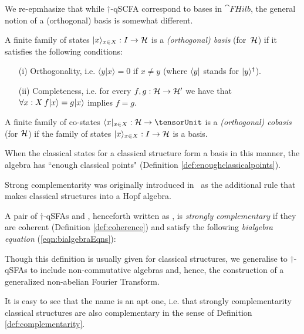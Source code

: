 We re-epmhasize that while $\dagger$-qSCFA correspond to bases in $\cat{FHilb}$, the general notion of a (orthogonal) basis is somewhat different.

\begin{defn}\label{def_basis}
A finite family of states $| x \rangle_{x\in X}: I \rightarrow \mathcal{H}$ is a \emph{(orthogonal) basis} (for~$\mathcal{H}$) if it satisfies the following conditions:
\begin{enumerate}
\item[(i)] Orthogonality, i.e. $\langle y|x\rangle = 0$ if $x \neq y$ (where $\langle y |$ stands for $| y \rangle^\dagger$).
\item[(ii)] Completeness, i.e. for every $f,g : \mathcal{H} \rightarrow \mathcal{H}'$ we have that $\forall x:X \, f | x \rangle = g | x \rangle$ implies $f=g$. 
\end{enumerate}
A finite family of co-states $\bra{x}_{x\in X}: \SpaceH \rightarrow \tensorUnit$ is a \emph{(orthogonal) cobasis} (for $\mathcal{H}$) if the family of states $| x \rangle_{x\in X}: I \rightarrow \mathcal{H}$ is a basis.
\end{defn}
\noindent When the classical states for a classical structure form a basis in this manner, the algebra has ``enough classical points" (Definition \ref{def:enoughclassicalpoints}).
 
Strong complementarity was originally introduced in~\cite{coecke2011interacting} as the additional rule that makes classical structures into a Hopf algebra.

\begin{defn}\label{def_StrongComplementarity}
A pair of $\dagger$-qSFAs  and , henceforth written as \scpair, is \emph{strongly complementary} if they are coherent (Definition \ref{def:coherence})  and  satisfy the following \emph{bialgebra equation} (\ref{eqn:bialgebraEqns}):
\begin{equation}
\label{eqn:bialgebraEqns}

\end{equation}
\end{defn}
\noindent Though this definition is usually given for classical structures, we generalise to $\dagger$-qSFAs to include non-commutative algebras and, hence, the construction of a generalized non-abelian Fourier Transform.

It is easy to see that the name is an apt one, i.e. that strongly complementarity classical structures are also complementary in the sense of Definition \ref{def:complementarity}. 
\begin{equation}

\end{equation}

